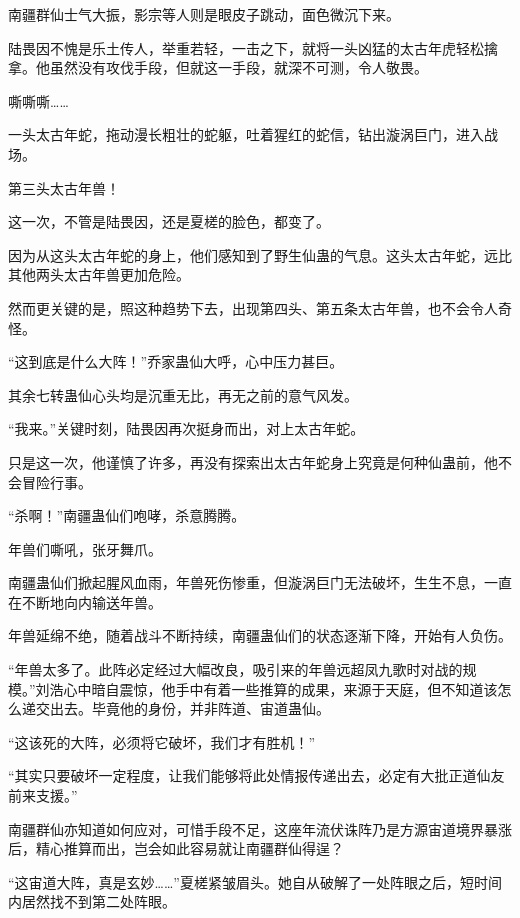 
\begin{this_body}

南疆群仙士气大振，影宗等人则是眼皮子跳动，面色微沉下来。

陆畏因不愧是乐土传人，举重若轻，一击之下，就将一头凶猛的太古年虎轻松擒拿。他虽然没有攻伐手段，但就这一手段，就深不可测，令人敬畏。

嘶嘶嘶……

一头太古年蛇，拖动漫长粗壮的蛇躯，吐着猩红的蛇信，钻出漩涡巨门，进入战场。

第三头太古年兽！

这一次，不管是陆畏因，还是夏槎的脸色，都变了。

因为从这头太古年蛇的身上，他们感知到了野生仙蛊的气息。这头太古年蛇，远比其他两头太古年兽更加危险。

然而更关键的是，照这种趋势下去，出现第四头、第五条太古年兽，也不会令人奇怪。

“这到底是什么大阵！”乔家蛊仙大呼，心中压力甚巨。

其余七转蛊仙心头均是沉重无比，再无之前的意气风发。

“我来。”关键时刻，陆畏因再次挺身而出，对上太古年蛇。

只是这一次，他谨慎了许多，再没有探索出太古年蛇身上究竟是何种仙蛊前，他不会冒险行事。

“杀啊！”南疆蛊仙们咆哮，杀意腾腾。

年兽们嘶吼，张牙舞爪。

南疆蛊仙们掀起腥风血雨，年兽死伤惨重，但漩涡巨门无法破坏，生生不息，一直在不断地向内输送年兽。

年兽延绵不绝，随着战斗不断持续，南疆蛊仙们的状态逐渐下降，开始有人负伤。

“年兽太多了。此阵必定经过大幅改良，吸引来的年兽远超凤九歌时对战的规模。”刘浩心中暗自震惊，他手中有着一些推算的成果，来源于天庭，但不知道该怎么递交出去。毕竟他的身份，并非阵道、宙道蛊仙。

“这该死的大阵，必须将它破坏，我们才有胜机！”

“其实只要破坏一定程度，让我们能够将此处情报传递出去，必定有大批正道仙友前来支援。”

南疆群仙亦知道如何应对，可惜手段不足，这座年流伏诛阵乃是方源宙道境界暴涨后，精心推算而出，岂会如此容易就让南疆群仙得逞？

“这宙道大阵，真是玄妙……”夏槎紧皱眉头。她自从破解了一处阵眼之后，短时间内居然找不到第二处阵眼。


\end{this_body}

